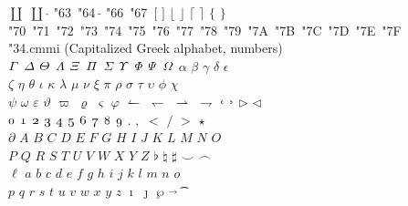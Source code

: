 \documentclass{article}
\begin{document}
$\coprod$ $\displaystyle\coprod$ $\widehat{}$ \selectfont\char"63\ \selectfont\char"64\ $\widetilde{}$ \selectfont\char"66\ \selectfont\char"67\ $\Big[$ $\Big]$ $\Big\lfloor$ $\Big\rfloor$ $\Big\lceil$ $\Big\rceil$ $\Big\{$ $\Big\}$\\
\selectfont\char"70\ \selectfont\char"71\ \selectfont\char"72\ \selectfont\char"73\ \selectfont\char"74\ \selectfont\char"75\ \selectfont\char"76\ \selectfont\char"77\ \selectfont\char"78\ \selectfont\char"79\ \selectfont\char"7A\ \selectfont\char"7B\ \selectfont\char"7C\ \selectfont\char"7D\ \selectfont\char"7E\ \selectfont\char"7F\ \\
\selectfont\char"34.cmmi (Capitalized Greek alphabet, numbers)\\
\noindent $\mathnormal{\Gamma}$ $\mathnormal{\Delta}$ $\mathnormal{\Theta}$ $\mathnormal{\Lambda}$ $\mathnormal{\Xi}$ $\mathnormal{\Pi}$ $\mathnormal{\Sigma}$ $\mathnormal{\Upsilon}$ $\mathnormal{\Phi}$ $\mathnormal{\Psi}$ $\mathnormal{\Omega}$ $\alpha$ $\beta$ $\gamma$ $\delta$ $\epsilon$\\ 
$\zeta$ $\eta$ $\theta$ $\iota$ $\kappa$ $\lambda$ $\mu$ $\nu$ $\xi$ $\pi$ $\rho$ $\sigma$ $\tau$ $\upsilon$ $\phi$ $\chi$\\
$\psi$ $\omega$ $\varepsilon$ $\vartheta$ $\varpi$ $\varrho$ $\varsigma$ $\varphi$ $\leftharpoonup$ $\leftharpoondown$ $\rightharpoonup$ $\rightharpoondown$ $\lhook$ $\rhook$ $\triangleright$ $\triangleleft$\\
$\mathnormal{0}$ $\mathnormal{1}$ $\mathnormal{2}$ $\mathnormal{3}$ $\mathnormal{4}$ $\mathnormal{5}$ $\mathnormal{6}$ $\mathnormal{7}$ $\mathnormal{8}$ $\mathnormal{9}$ $.$ $,$ $<$ $/$ $>$ $\star$\\
$\partial$ $A$ $B$ $C$ $D$ $E$ $F$ $G$ $H$ $I$ $J$ $K$ $L$ $M$ $N$ $O$\\
$P$ $Q$ $R$ $S$ $T$ $U$ $V$ $W$ $X$ $Y$ $Z$ $\flat$ $\natural$ $\sharp$ $\smile$ $\frown$\\
$\ell$ $a$ $b$ $c$ $d$ $e$ $f$ $g$ $h$ $i$ $j$ $k$ $l$ $m$ $n$ $o$\\
$p$ $q$ $r$ $s$ $t$ $u$ $v$ $w$ $x$ $y$ $z$ $\imath$ $\jmath$ $\wp$ $\vec{}$ \t{}%

\end{document}
